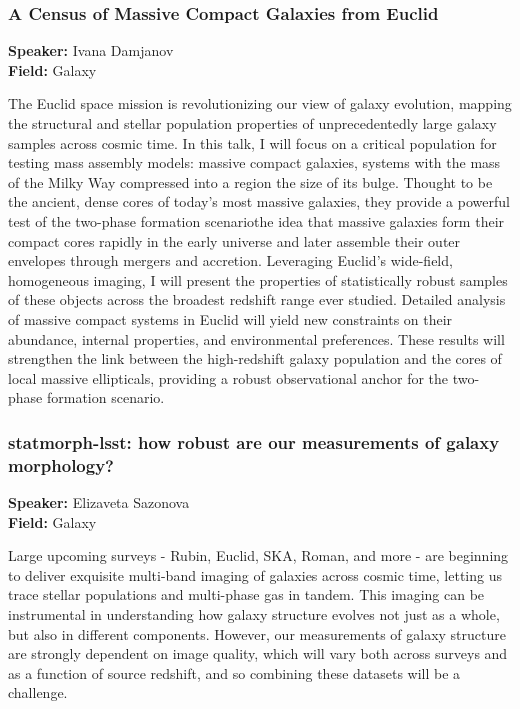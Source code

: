 \hypertarget{abstract-talk-329}{}\label{abstract-page-talk-329}
\subsubsection*{A Census of Massive Compact Galaxies from Euclid}
\textbf{Speaker:} Ivana Damjanov\\
\textbf{Field:} Galaxy

The Euclid space mission is revolutionizing our view of galaxy evolution, mapping the structural and stellar population properties of unprecedentedly large galaxy samples across cosmic time. In this talk, I will focus on a critical population for testing mass assembly models: massive compact galaxies, systems with the mass of the Milky Way compressed into a region the size of its bulge. Thought to be the ancient, dense cores of today's most massive galaxies, they provide a powerful test of the two-phase formation scenariothe idea that massive galaxies form their compact cores rapidly in the early universe and later assemble their outer envelopes through mergers and accretion. Leveraging Euclid's wide-field, homogeneous imaging, I will present the properties of statistically robust samples of these objects across the broadest redshift range ever studied. Detailed analysis of massive compact systems in Euclid will yield new constraints on their abundance, internal properties, and environmental preferences. These results will strengthen the link between the high-redshift galaxy population and the cores of local massive ellipticals, providing a robust observational anchor for the two-phase formation scenario.

\hypertarget{abstract-talk-203}{}\label{abstract-page-talk-203}
\subsubsection*{statmorph-lsst: how robust are our measurements of galaxy morphology?}
\textbf{Speaker:} Elizaveta Sazonova\\
\textbf{Field:} Galaxy

Large upcoming surveys - Rubin, Euclid, SKA, Roman, and more - are beginning to deliver exquisite multi-band imaging of galaxies across cosmic time, letting us trace stellar populations and multi-phase gas in tandem. This imaging can be instrumental in understanding how galaxy structure evolves not just as a whole, but also in different components. However, our measurements of galaxy structure are strongly dependent on image quality, which will vary both across surveys and as a function of source redshift, and so combining these datasets will be a challenge.


